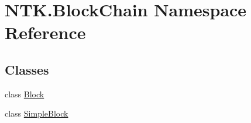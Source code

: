 \hypertarget{namespace_n_t_k_1_1_block_chain}{}\section{N\+T\+K.\+Block\+Chain Namespace Reference}
\label{namespace_n_t_k_1_1_block_chain}
\subsection*{Classes}
\begin{DoxyCompactItemize}
\item 
class \mbox{\hyperlink{class_n_t_k_1_1_block_chain_1_1_block}{Block}}
\item 
class \mbox{\hyperlink{class_n_t_k_1_1_block_chain_1_1_simple_block}{Simple\+Block}}
\end{DoxyCompactItemize}
